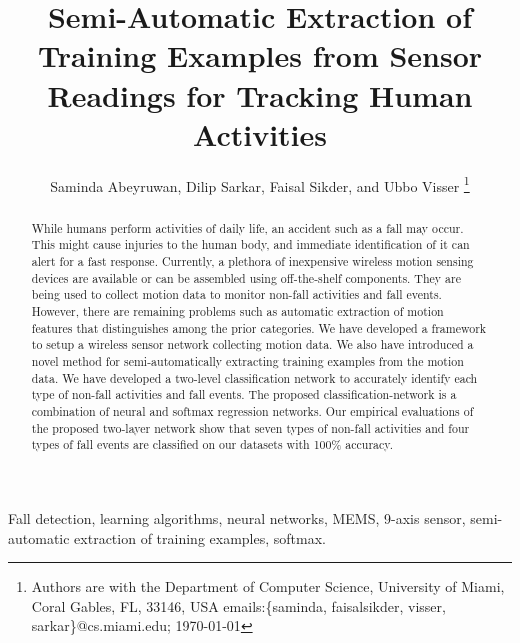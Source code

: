 \documentclass[]{IEEEtran}
\title{Semi-Automatic Extraction of Training Examples from Sensor Readings for Tracking Human Activities}
\author{{Saminda Abeyruwan}, {Dilip Sarkar}, {Faisal Sikder}, and {Ubbo Visser}
\thanks{ Authors are with
 the
Department of Computer Science, University of Miami,
  Coral Gables, FL, 33146, USA
{ emails:\{saminda, faisalsikder, visser, sarkar\}@cs.miami.edu};
\today} }
\begin{document}
\maketitle
\IEEEpeerreviewmaketitle

\begin{abstract}
While humans perform activities of daily life, an accident 
such as a fall may occur. This might cause injuries to the human body, and immediate identification of it can alert for a fast response.  Currently, a plethora of inexpensive wireless motion sensing devices are available or can be assembled using off-the-shelf components. They are being used to collect motion data to monitor non-fall activities and fall events. However, there are remaining problems such as automatic extraction of motion features that distinguishes among the prior categories. We have developed a framework to setup a wireless sensor network collecting motion data. We also have introduced a novel method for semi-automatically extracting training examples from the motion data. We have developed a two-level classification network to accurately identify each type of non-fall activities and fall events. The proposed classification-network is a combination of neural and softmax regression networks.  Our empirical evaluations of the proposed two-layer network show that seven types of non-fall activities and four types of fall events are classified on our datasets with 100\% accuracy. 
\end{abstract}

\begin{IEEEkeywords} Fall detection, learning algorithms, neural networks, {MEMS}, 9-axis sensor, semi-automatic extraction of training examples, softmax.
\end{IEEEkeywords}

\end{document}
